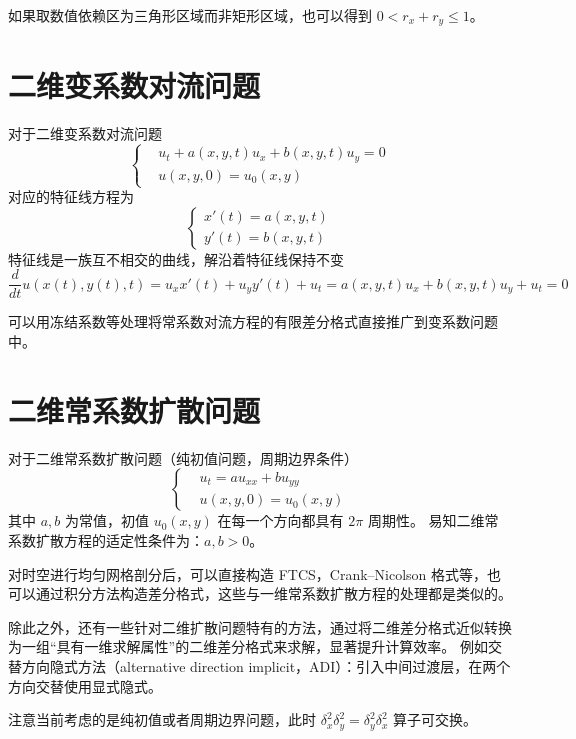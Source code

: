 \begin{remark}
    如果取数值依赖区为三角形区域而非矩形区域，也可以得到 $0 < r_x + r_y \le 1$。
\end{remark}

\section{二维变系数对流问题}


对于二维变系数对流问题
\[
    \left\{
    \begin{aligned}
         & u_t + a(x,y,t) u_x + b(x,y,t) u_y = 0 \\
         & u(x,y,0) = u_0(x,y)
    \end{aligned}
    \right.
\]
对应的特征线方程为
\[
    \left\{
    \begin{aligned}
        x'(t) = a(x,y,t) \\
        y'(t) = b(x,y,t)
    \end{aligned}
    \right.
\]
特征线是一族互不相交的曲线，解沿着特征线保持不变
\[
    \frac{d}{dt}u(x(t),y(t),t) = u_x x'(t) + u_y y'(t) + u_t = a(x,y,t) u_x + b(x,y,t) u_y + u_t = 0
\]

可以用冻结系数等处理将常系数对流方程的有限差分格式直接推广到变系数问题中。


\section{二维常系数扩散问题}

对于二维常系数扩散问题（纯初值问题，周期边界条件）
\[
    \left\{
    \begin{aligned}
         & u_t = a u_{xx} + b u_{yy} \\
         & u(x,y,0) = u_0(x,y)
    \end{aligned}
    \right.
\]
其中 $a,b$ 为常值，初值 $u_0(x,y)$ 在每一个方向都具有 $2\pi$ 周期性。
易知二维常系数扩散方程的适定性条件为：$a,b > 0$。

对时空进行均匀网格剖分后，可以直接构造 FTCS，Crank–Nicolson 格式等，也可以通过积分方法构造差分格式，这些与一维常系数扩散方程的处理都是类似的。

除此之外，还有一些针对二维扩散问题特有的方法，通过将二维差分格式近似转换为一组“具有一维求解属性”的二维差分格式来求解，显著提升计算效率。
例如交替方向隐式方法（alternative direction implicit，ADI）：引入中间过渡层，在两个方向交替使用显式隐式。

\begin{remark}
    注意当前考虑的是纯初值或者周期边界问题，此时 $\delta_x^2 \delta_y^2 = \delta_y^2 \delta_x^2$ 算子可交换。
\end{remark}


